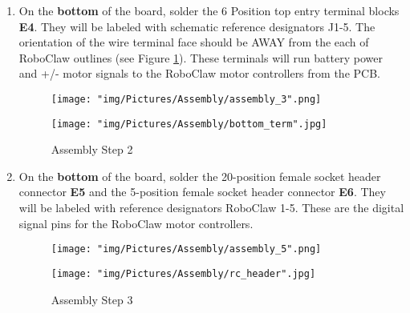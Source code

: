 \documentclass{article}
\begin{document}
\begin{enumerate}
\item On the \textbf{bottom} of the board, solder the 6 Position top entry terminal blocks \textbf{E4}. They will be labeled with schematic reference designators J1-5. The orientation of the wire terminal face should be AWAY from the each of RoboClaw outlines (see Figure \ref{assem_2}). These terminals will run battery power and +/- motor signals to the RoboClaw motor controllers from the PCB.

\begin{figure}[H]
  \centering
  \begin{minipage}[b]{0.45\textwidth}
    \texttt{[image: "img/Pictures/Assembly/assembly\_3".png]}
  \end{minipage}
  \hfill
  \begin{minipage}[b]{0.45\textwidth}
    \texttt{[image: "img/Pictures/Assembly/bottom\_term".jpg]}
  \end{minipage}
  \caption{Assembly Step 2}
  \label{assem_2}
\end{figure}

\item On the \textbf{bottom} of the board, solder the 20-position female socket header connector \textbf{E5} and the 5-position female socket header connector \textbf{E6}. They will be labeled with reference designators RoboClaw 1-5. These are the digital signal pins for the RoboClaw motor controllers.

\begin{figure}[H]
  \centering
  \begin{minipage}[b]{0.45\textwidth}
    \texttt{[image: "img/Pictures/Assembly/assembly\_5".png]}
  \end{minipage}
  \hfill
  \begin{minipage}[b]{0.45\textwidth}
    \texttt{[image: "img/Pictures/Assembly/rc\_header".jpg]}
  \end{minipage}
  \caption{Assembly Step 3}
  \label{assem_3}
\end{figure}

\end{enumerate}
\end{document}
